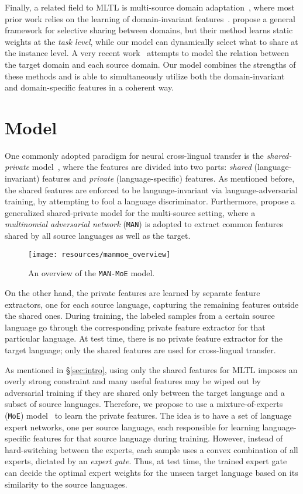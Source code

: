 \documentclass[11pt,a4paper]{article}
\newcommand{\secref}[1]{\S\ref{#1}}
\newcommand{\manmoe}{\texttt{MAN-MoE}}
\newcommand{\man}{\texttt{MAN}}
\newcommand{\moe}{\texttt{MoE}}
\begin{document}
Finally, a related field to MLTL is multi-source domain adaptation~\cite{NIPS2008_3550}, where most prior work relies on the learning of domain-invariant features~\cite{NIPS2018_8075,N18-1111}.
 propose a general framework for selective sharing between domains, but their method learns static weights at the \emph{task level}, while our model can dynamically select what to share at the instance level.
A very recent work~\cite{guo-shah-barzilay:2018:EMNLP} attempts to model the relation between the target domain and each source domain.
Our model combines the strengths of these methods and is able to simultaneously utilize both the domain-invariant and domain-specific features in a coherent way. \section{Model}\label{sec:model}
One commonly adopted paradigm for neural cross-lingual transfer is the \emph{shared-private} model~\citep{NIPS2016_6254}, where the features are divided into two parts: \emph{shared} (language-invariant) features and \emph{private} (language-specific) features.
As mentioned before, the shared features are enforced to be language-invariant via language-adversarial training, by attempting to fool a language discriminator.
Furthermore, \citet{N18-1111} propose a generalized shared-private model for the multi-source setting, where a \emph{multinomial adversarial network} (\man{}) is adopted to extract common features shared by all source languages as well as the target.
\begin{figure}
    \centering
    \texttt{[image: resources/manmoe\_overview]}
    \caption{An overview of the \manmoe{} model.}
    \label{fig:manmoe}
\vspace{-3mm}
\end{figure} On the other hand, the private features are learned by separate feature extractors, one for each source language, capturing the remaining features outside the shared ones.
During training, the labeled samples from a certain source language go through the corresponding private feature extractor for that particular language. At test time, there is no private feature extractor for the target language; only the shared features are used for cross-lingual transfer.

As mentioned in \secref{sec:intro}, using only the shared features for MLTL imposes an overly strong constraint and many useful features may be wiped out by adversarial training if they are shared only between the target language and a subset of source languages.
Therefore, we propose to use a mixture-of-experts (\moe{}) model~\citep{shazeer2017moe,N18-1032} to learn the private features.
The idea is to have a set of language expert networks, one per source language, each responsible for learning language-specific features for that source language during training.
However, instead of hard-switching between the experts, each sample uses a convex combination of all experts, dictated by an \emph{expert gate}.
Thus, at test time, the trained expert gate can decide the optimal expert weights for the unseen target language based on its similarity to the source languages.
\end{document}
